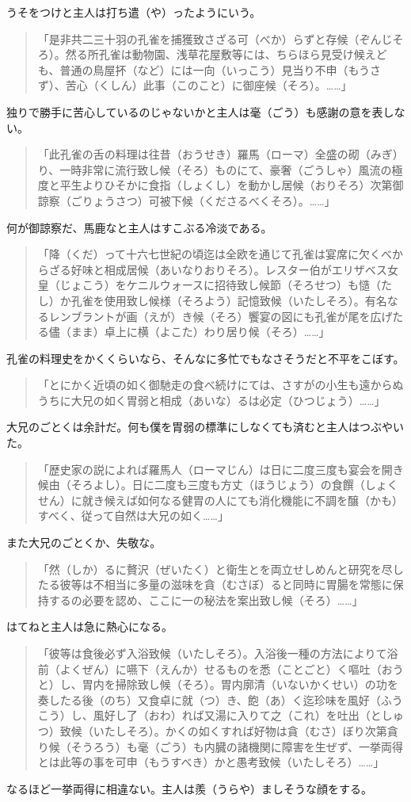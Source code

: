 \documentclass{book}
\begin{document}
うそをつけと主人は打ち遣（や）ったようにいう。
\blockquote{「是非共二三十羽の孔雀を捕獲致さざる可（べか）らずと存候（ぞんじそろ）。然る所孔雀は動物園、浅草花屋敷等には、ちらほら見受け候えども、普通の鳥屋抔（など）には一向（いっこう）見当り不申（もうさず）、苦心（くしん）此事（このこと）に御座候（そろ）。\ldots{}\ldots{}」}
独りで勝手に苦心しているのじゃないかと主人は毫（ごう）も感謝の意を表しない。
\blockquote{「此孔雀の舌の料理は往昔（おうせき）羅馬（ローマ）全盛の砌（みぎ）り、一時非常に流行致し候（そろ）ものにて、豪奢（ごうしゃ）風流の極度と平生よりひそかに食指（しょくし）を動かし居候（おりそろ）次第御諒察（ごりょうさつ）可被下候（くださるべくそろ）。\ldots{}\ldots{}」}
何が御諒察だ、馬鹿なと主人はすこぶる冷淡である。
\blockquote{「降（くだ）って十六七世紀の頃迄は全欧を通じて孔雀は宴席に欠くべからざる好味と相成居候（あいなりおりそろ）。レスター伯がエリザベス女皇（じょこう）をケニルウォースに招待致し候節（そろせつ）も慥（たし）か孔雀を使用致し候様（そろよう）記憶致候（いたしそろ）。有名なるレンブラントが画（えが）き候（そろ）饗宴の図にも孔雀が尾を広げたる儘（まま）卓上に横（よこた）わり居り候（そろ）\ldots{}\ldots{}」}
孔雀の料理史をかくくらいなら、そんなに多忙でもなさそうだと不平をこぼす。
\blockquote{「とにかく近頃の如く御馳走の食べ続けにては、さすがの小生も遠からぬうちに大兄の如く胃弱と相成（あいな）るは必定（ひつじょう）\ldots{}\ldots{}」}
大兄のごとくは余計だ。何も僕を胃弱の標準にしなくても済むと主人はつぶやいた。
\blockquote{「歴史家の説によれば羅馬人（ローマじん）は日に二度三度も宴会を開き候由（そろよし）。日に二度も三度も方丈（ほうじょう）の食饌（しょくせん）に就き候えば如何なる健胃の人にても消化機能に不調を醸（かも）すべく、従って自然は大兄の如く\ldots{}\ldots{}」}
また大兄のごとくか、失敬な。
\blockquote{「然（しか）るに贅沢（ぜいたく）と衛生とを両立せしめんと研究を尽したる彼等は不相当に多量の滋味を貪（むさぼ）ると同時に胃腸を常態に保持するの必要を認め、ここに一の秘法を案出致し候（そろ）\ldots{}\ldots{}」}
はてねと主人は急に熱心になる。
\blockquote{「彼等は食後必ず入浴致候（いたしそろ）。入浴後一種の方法によりて浴前（よくぜん）に嚥下（えんか）せるものを悉（ことごと）く嘔吐（おうと）し、胃内を掃除致し候（そろ）。胃内廓清（いないかくせい）の功を奏したる後（のち）又食卓に就（つ）き、飽（あ）く迄珍味を風好（ふうこう）し、風好し了（おわ）れば又湯に入りて之（これ）を吐出（としゅつ）致候（いたしそろ）。かくの如くすれば好物は貪（むさ）ぼり次第貪り候（そうろう）も毫（ごう）も内臓の諸機関に障害を生ぜず、一挙両得とは此等の事を可申（もうすべき）かと愚考致候（いたしそろ）\ldots{}\ldots{}」}
なるほど一挙両得に相違ない。主人は羨（うらや）ましそうな顔をする。
\end{document}
